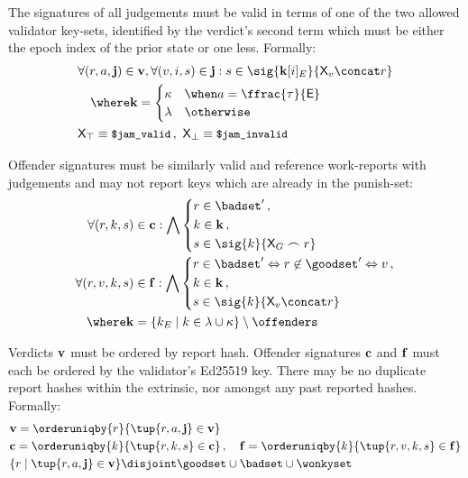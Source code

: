 The signatures of all judgements must be valid in terms of one of the two allowed validator key-sets, identified by the verdict's second term which must be either the epoch index of the prior state or one less. Formally:
\begin{align}
  &\begin{aligned}
    &\forall (r, a, \mathbf{j}) \in \xtverdicts, \forall (v, i, s) \in \mathbf{j} : s \in \sig{\mathbf{k}[i]_E}{\mathsf{X}_v \concat r}\\
    &\quad\where \mathbf{k} = \begin{cases}
      \kappa &\when a = \displaystyle \ffrac{\tau}{\mathsf{E}}\\
      \lambda &\otherwise\\
    \end{cases}
  \end{aligned}\\
  &\mathsf{X}_\top \equiv \text{{\small \texttt{\$jam\_valid}}}\,,\ \mathsf{X}_\bot \equiv \text{{\small \texttt{\$jam\_invalid}}}
\end{align}

Offender signatures must be similarly valid and reference work-reports with judgements and may not report keys which are already in the punish-set:
\begin{align}
  \forall (r, k, s) &\in \xtculprits : \bigwedge \left\{
  \begin{aligned}
    &r \in \badset' \,,\\
    &k \in \mathbf{k} \,,\\
    &s \in \sig{k}{\mathsf{X}_G \frown r}
  \end{aligned}\right.\\
  \forall (r, v, k, s) &\in \xtfaults : \bigwedge \left\{ \begin{aligned}
    &r \in \badset' \Leftrightarrow r \not\in \goodset' \Leftrightarrow v \,,\\
    &k \in \mathbf{k} \,,\\
    &s \in \sig{k}{\mathsf{X}_v \concat r}\\
  \end{aligned}\right.\\
  \nonumber\where \mathbf{k} &= \{k_E \mid k \in \lambda \cup \kappa\} \setminus \offenders
\end{align}

Verdicts $\mathbf{v}$ must be ordered by report hash. Offender signatures $\mathbf{c}$ and $\mathbf{f}$ must each be ordered by the validator's Ed25519 key. There may be no duplicate report hashes within the extrinsic, nor amongst any past reported hashes. Formally:
\begin{align}
  &\xtverdicts = \orderuniqby{r}{\tup{r, a, \mathbf{j}} \in \xtverdicts}\\
  &\xtculprits = \orderuniqby{k}{\tup{r, k, s} \in \xtculprits} \,,\quad
  \xtfaults = \orderuniqby{k}{\tup{r, v, k, s} \in \xtfaults}\\
  &\{r \mid \tup{r, a, \mathbf{j}} \in \xtverdicts\} \disjoint \goodset \cup \badset \cup \wonkyset
\end{align}

